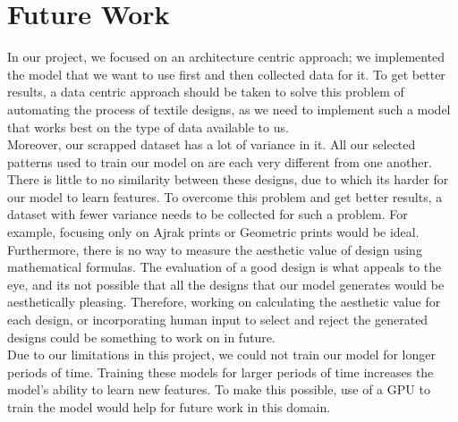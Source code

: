 \documentclass[conference]{IEEEtran}
\begin{document}
\section{Future Work}
In our project, we focused on an architecture centric approach; we implemented the model that we want to use first and then collected data for it. To get better results, a data centric approach should be taken to solve this problem of automating the process of textile designs, as we need to implement such a model that works best on the type of data available to us. \\
Moreover, our scrapped dataset has a lot of variance in it. All our selected patterns used to train our model on are each very different from one another. There is little to no similarity between these designs, due to which its harder for our model to learn features. To overcome this problem and get better results, a dataset with fewer variance needs to be collected for such a problem. For example, focusing only on Ajrak prints or Geometric prints would be ideal. \\

Furthermore, there is no way to measure the aesthetic value of design using mathematical formulas. The evaluation of a good design is what appeals to the eye, and its not possible that all the designs that our model generates would be aesthetically pleasing. Therefore, working on calculating the aesthetic value for each design, or incorporating human input to select and reject the generated designs could be something to work on in future.
\\
Due to our limitations in this project, we could not train our model for longer periods of time. Training these models for larger periods of time increases the model's ability to learn new features. To make this possible, use of a GPU to train the model would help for future work in this domain.  \\





\end{document}
